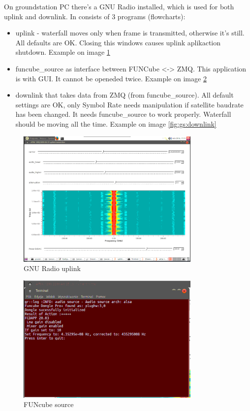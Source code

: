 
On groundstation PC there's a GNU Radio installed, which is used for both uplink and downlink. In consists of 3 programs (flowcharts):

\begin{itemize}
	\item uplink - waterfall moves only when frame is transmitted, otherwise it's still. All defaults are OK. Closing this windows causes uplink aplikaction shutdown. Example on image \ref{fig:gs:uplink}
	\item funcube_source as interface between FUNCube <-> ZMQ. This application is with GUI. It cannot be openeded twice. Example on image \ref{fig:gs:fcd_source}
	\item downlink that takes data from ZMQ (from funcube_source). All default settings are OK, only Symbol Rate needs manipulation if satellite baudrate has been changed. It needs funcube_source to work properly. Waterfall should be moving all the time. Example on image \ref{fig:gs:downlink}
\end{itemize}

\begin{figure}
	\includegraphics[width=0.8\textwidth]{gs/img/uplink.png}
	\caption{\label{fig:gs:uplink} GNU Radio uplink}
\end{figure}

\begin{figure}
	\includegraphics[width=0.8\textwidth]{gs/img/fcd-source.png}
	\caption{\label{fig:gs:fcd_source} FUNcube source}
\end{figure}

